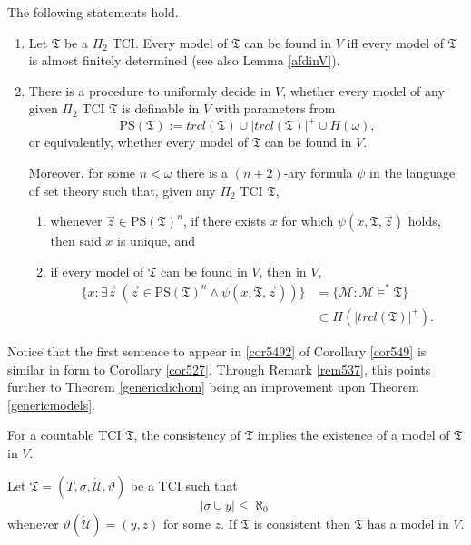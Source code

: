 \documentclass[12pt]{article}
\numberwithin{equation}{section}
\begin{document}
\begin{cor}\label{cor549}
The following statements hold.
\begin{enumerate}[label=(\arabic*)]
    \item Let $\mathfrak{T}$ be a $\Pi_2$ TCI. Every model of $\mathfrak{T}$ can be found in $V$ iff every model of $\mathfrak{T}$ is almost finitely determined (see also Lemma \ref{afdinV}).
    \item\label{cor5492} There is a procedure to uniformly decide in $V$, whether every model of any given $\Pi_2$ TCI $\mathfrak{T}$ is definable in $V$ with parameters from $$\mathrm{PS}(\mathfrak{T}) := trcl(\mathfrak{T}) \cup |trcl(\mathfrak{T})|^+ \cup H(\omega) \text{,}$$ or equivalently, whether every model of $\mathfrak{T}$ can be found in $V$.
    
    Moreover, for some $n < \omega$ there is a $(n+2)$-ary formula $\psi$ in the language of set theory such that, given any $\Pi_2$ TCI $\mathfrak{T}$,
    \begin{enumerate}[label=(\alph*)]
        \item whenever $\Vec{z} \in \mathrm{PS}(\mathfrak{T})^n$, if there exists $x$ for which $\psi(x, \mathfrak{T}, \Vec{z})$ holds, then said $x$ is unique, and
        \item if every model of $\mathfrak{T}$ can be found in $V$, then in $V$, 
        \begin{align*}
            \{x : \exists \Vec{z} \ (\Vec{z} \in \mathrm{PS}(\mathfrak{T})^n \wedge \psi(x, \mathfrak{T}, \Vec{z}))\} & = \{\mathcal{M} : \mathcal{M} \models^* \mathfrak{T}\} \\
            & \subset H(|trcl(\mathfrak{T})|^+) \text{.}
        \end{align*}
    \end{enumerate}
\end{enumerate}
\end{cor}
Notice that the first sentence to appear in \ref{cor5492} of Corollary \ref{cor549} is similar in form to Corollary \ref{cor527}. Through Remark \ref{rem537}, this points further to Theorem \ref{genericdichom} being an improvement upon Theorem \ref{genericmodels}. 

For a countable TCI $\mathfrak{T}$, the consistency of $\mathfrak{T}$ implies the existence of a model of $\mathfrak{T}$ in $V$. 

\begin{lem}\label{modelinV}
Let $\mathfrak{T} = (T, \sigma, \dot{\mathcal{U}}, \vartheta)$ be a TCI such that $$|\sigma \cup y| \leq \aleph_0$$ whenever $\vartheta(\dot{\mathcal{U}}) = (y, z)$ for some $z$. If $\mathfrak{T}$ is consistent then $\mathfrak{T}$ has a model in $V$.
\end{lem}
\end{document}
